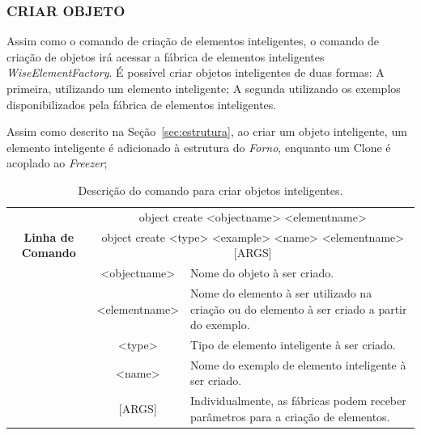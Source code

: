 \documentclass[a4paper,12pt]{monografia}
\theoremstyle{plain}
\theoremstyle{definition}
\theoremstyle{remark}
\begin{document}
\subsubsection{CRIAR OBJETO}\label{sec:create_object}

Assim como o comando de criação de elementos inteligentes, o comando de criação de objetos irá acessar a fábrica de elementos inteligentes \textit{WiseElementFactory}. É possível criar objetos inteligentes de duas formas: A primeira, utilizando um elemento inteligente; A segunda utilizando os exemplos disponibilizados pela fábrica de elementos inteligentes.

Assim como descrito na Seção~\ref{sec:estrutura}, ao criar um objeto inteligente, um elemento inteligente é adicionado à estrutura do \textit{Forno}, enquanto um Clone é acoplado ao \textit{Freezer};

\begin{center}
	\begin{table}[!htbp]
		\begin{tabular}{|c|c|m{}|}
			\hline
			\multirow{3}{*}{\textbf{Linha de Comando}} & \multicolumn{2}{c|}{object create <object\underline{\space\space}name> <element\underline{\space\space}name>} \\
			& \multicolumn{2}{c|}{object create <type> <example> <name> <element\underline{\space\space}name> [ARGS]} \\
			\hline
			\multirow{3}{*}{\textbf{Entrada}} & <object\underline{\space\space}name> & Nome do objeto à ser criado. \\
			& <element\underline{\space\space}name> & Nome do elemento à ser utilizado na criação ou do elemento à ser criado a partir do exemplo. \\
			& <type> & Tipo de elemento inteligente à ser criado. \\
			& <name> & Nome do exemplo de elemento inteligente à ser criado. \\
			& [ARGS] & Individualmente,  as fábricas podem receber parâmetros para a criação de elementos. \\
			\hline
		\end{tabular}
		\caption{Descrição do comando para criar objetos inteligentes.}
		\label{tab:create_object}
	\end{table}
\end{center}

\end{document}
